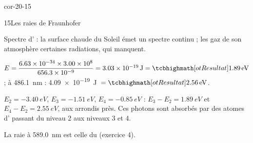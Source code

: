 \begin{blocLivre}{cor-20-15}
\begin{corrige}{15}{Les raies de Fraunhofer}
\begin{questions}
\item Spectre d' : la surface chaude du Soleil émet un spectre continu ; les gaz de son atmosphère 
certaines radiations, qui manquent.
\item $E=\dfrac{\num{6,63e-34}\times\num{3,00e8}}{\num{656,3e-9}}=\qty{3,03e-19}{J}=\res{\qty{1,89}{eV}}$ ; à \qty{486,1}{nm} : \qty{4,09e-19}{J}~$=\res{\qty{2,56}{eV}}$.
\item $E_2=\qty{-3,40}{eV}$, $E_3=\qty{-1,51}{eV}$, $E_4=\qty{-0,85}{eV}$ : $E_3-E_2=\qty{1,89}{eV}$ et $E_4-E_2=\qty{2,55}{eV}$, aux arrondis près. Ces
photons sont absorbés par des atomes d' passant du niveau 2 aux niveaux 3 et 4.
\item La raie à \qty{589,0}{nm} est celle du  (exercice 4).
\end{questions}
\end{corrige}
\end{blocLivre}
